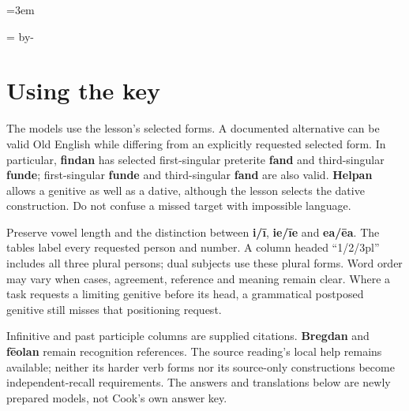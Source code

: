 \BookRecto
\begingroup
\renewcommand{\runningtitle}{Unit 4. Answer key}
\emergencystretch=3em
\newcommand{\itempara}[2]{\par\addvspace{3pt}\noindent\hangindent=1.8em\hangafter=1\makebox[1.8em][l]{#1.}#2\par}
\newcommand{\reserve}[1]{\par\penalty-100\begingroup\dimen0=\pagegoal\advance\dimen0 by-\pagetotal\ifdim\dimen0<#1\newpage\fi\endgroup}

\raggedright
{}

\reserve{7\baselineskip}
\section*{Using the key}

The models use the lesson's selected forms. A documented alternative can be valid Old English while differing from an explicitly requested selected form. In particular, \textbf{findan} has selected first-singular preterite \textbf{fand} and third-singular \textbf{funde}; first-singular \textbf{funde} and third-singular \textbf{fand} are also valid. \textbf{Helpan} allows a genitive as well as a dative, although the lesson selects the dative construction. Do not confuse a missed target with impossible language.

Preserve vowel length and the distinction between \textbf{i/\allowbreak{}ī}, \textbf{ie/\allowbreak{}īe} and \textbf{ea/\allowbreak{}ēa}. The tables label every requested person and number. A column headed “1/\allowbreak{}2/\allowbreak{}3pl” includes all three plural persons; dual subjects use these plural forms. Word order may vary when cases, agreement, reference and meaning remain clear. Where a task requests a limiting genitive before its head, a grammatical postposed genitive still misses that positioning request.

Infinitive and past participle columns are supplied citations. \textbf{Bregdan} and \textbf{fēolan} remain recognition references. The source reading's local help remains available; neither its harder verb forms nor its source-only constructions become independent-recall requirements. The answers and translations below are newly prepared models, not Cook's own answer key.

